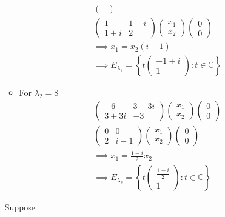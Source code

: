 \begin{enumerate}
\begin{itemize}
\begin{gather}
\begin{pmatrix}
\end{pmatrix}\\
\begin{pmatrix}
1 & 1-i\\
1+i & 2
\end{pmatrix}
\begin{pmatrix}
x_1 \\x_2
\end{pmatrix}
\begin{pmatrix}
0\\0
\end{pmatrix}\\
\implies x_1 = x_2(i-1)\\
\implies E_{\lambda_1} = \left\{
t\begin{pmatrix}-1 +i\\1\end{pmatrix}\colon t \in \mathbb{C}
\right\}
\end{gather}
\item For $\lambda_2 = 8$
\begin{gather}
\begin{pmatrix}
-6 & 3-3i\\
3+3i & -3
\end{pmatrix}
\begin{pmatrix}
x_1 \\x_2
\end{pmatrix}
\begin{pmatrix}
0\\0
\end{pmatrix}\\
\begin{pmatrix}
0 & 0\\
2 & i-1
\end{pmatrix}
\begin{pmatrix}
x_1 \\x_2
\end{pmatrix}
\begin{pmatrix}
0\\0
\end{pmatrix}\\
\implies x_1 = \frac{1-i}{2}x_2\\
\implies E_{\lambda_2} = \left\{
t\begin{pmatrix}\frac{1-i}{2}\\1\end{pmatrix}\colon t \in \mathbb{C}
\right\}
\end{gather}
\end{itemize}
Suppose
\begin{align}

\end{align}
\end{enumerate}
